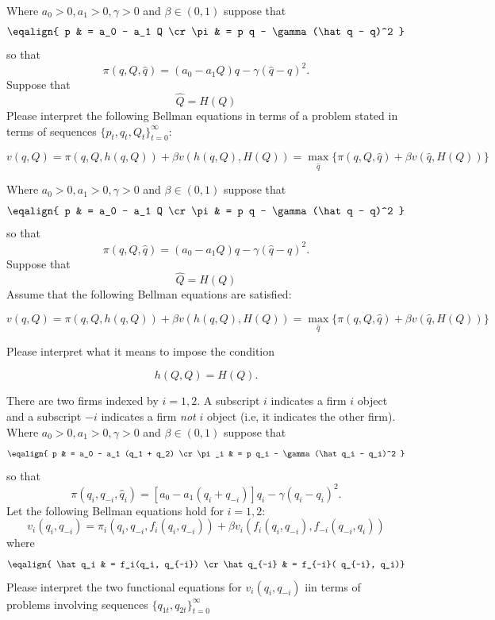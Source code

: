 \medskip


 Where $a_0 >0, a_1> 0, \gamma > 0$ and $\beta \in (0,1)$ suppose that
$$\eqalign{ p & = a_0 - a_1 Q \cr
           \pi &  = p q - \gamma(\hat q - q)^2 } $$
so that
$$ \pi(q, Q, \hat q) = (a_0 - a_1 Q) q - \gamma (\hat q - q)^2 .$$
Suppose that
$$ \hat Q  = H(Q)  $$
Please interpret the following Bellman equations in terms of a problem stated in terms of sequences  $\{p_t, q_t, Q_t\}_{t=0}^\infty$:

$$v(q, Q)  = \pi(q,Q, h(q, Q) ) + \beta v\left(h(q,Q) ,
H(Q)\right)  = \max_{\hat q} \{\pi(q, Q, \hat q) + \beta v(\hat q, H(Q) )   \} 
$$

\medskip

 Where $a_0 >0, a_1> 0, \gamma > 0$ and $\beta \in (0,1)$ suppose that
$$\eqalign{ p & = a_0 - a_1 Q \cr
           \pi &  = p q - \gamma(\hat q - q)^2 } $$
so that
$$ \pi(q, Q, \hat q) = (a_0 - a_1 Q) q- \gamma (\hat q - q)^2 .$$
Suppose that
$$ \hat Q  = H(Q)  $$
Assume that the following Bellman equations are satisfied: %

$$ v(q, Q) = \pi(q,Q, h(q,Q)) + \beta v\left(h(q,Q), H(Q)\right) = \max_{\hat q} \{\pi(q, Q, \hat q) + \beta v(\hat q, H(Q) )   \} $$

\noindent Please interpret what it means to impose the condition

$$ h(Q, Q) = H(Q) .$$

\medskip

  There are two firms indexed by $i = 1,2$.  A subscript $i$ indicates a  firm $i$ object  and a subscript $-i$ indicates
a firm {\it not\/} $i$ object (i.e, it indicates the other firm). Where $a_0 >0, a_1> 0, \gamma > 0$ and $\beta \in (0,1)$ suppose that
$$\eqalign{ p & = a_0 - a_1 (q_1 + q_2)  \cr
           \pi_i  &  = p q_i - \gamma(\hat q_i - q_i)^2 } $$
so that
$$ \pi(q_i, q_{-i}, \hat q_i) = [a_0 - a_1 (q_i + q_{-i}) ] q_i - \gamma (\hat q_i - q_i)^2 . $$
Let the following Bellman equations hold for $i=1,2$:
$$ v_i(q_i, q_{-i}) = \pi_i( q_i, q_{-i}, f_i(q_i, q_{-i})) + \beta v_i(f_i(q_i, q_{-i}), f_{-i}(q_{-i}, q_i) )   $$
where
$$\eqalign{ \hat q_i & = f_i(q_i,  q_{-i}) \cr
                  \hat q_{-i} & = f_{-i}( q_{-i}, q_i)} $$
                  Please interpret the two functional equations for $ v_i(q_i, q_{-i})$ iin terms of problems  involving sequences $\{q_{1t}, q_{2t}\}_{t=0}^\infty$




